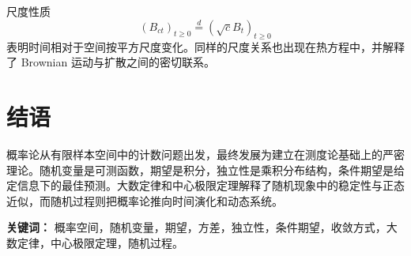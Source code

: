 \begin{remark}
尺度性质
\[
    (B_{ct})_{t\geq0}
    \overset{d}{=}
    (\sqrt{c}B_t)_{t\geq0}
\]
表明时间相对于空间按平方尺度变化。同样的尺度关系也出现在热方程中，并解释了 Brownian 运动与扩散之间的密切联系。
\end{remark}


\section{结语}

概率论从有限样本空间中的计数问题出发，最终发展为建立在测度论基础上的严密理论。随机变量是可测函数，期望是积分，独立性是乘积分布结构，条件期望是给定信息下的最佳预测。大数定律和中心极限定理解释了随机现象中的稳定性与正态近似，而随机过程则把概率论推向时间演化和动态系统。

\textbf{关键词：} 概率空间，随机变量，期望，方差，独立性，条件期望，收敛方式，大数定律，中心极限定理，随机过程。
